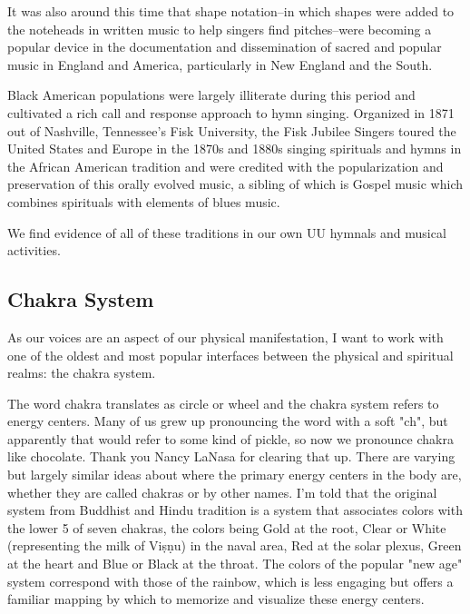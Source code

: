 \documentclass[12pt]{article}
\begin{document}
It was also around this time that shape notation–in which shapes were added to the noteheads in written music to help singers find pitches–were becoming a popular device in the documentation and dissemination of sacred and popular music in England and America, particularly in New England and the South.

Black American populations were largely illiterate during this period and cultivated a rich call and response approach to hymn singing. Organized in 1871 out of Nashville, Tennessee's Fisk University, the Fisk Jubilee Singers toured the United States and Europe in the 1870s and 1880s singing spirituals and hymns in the African American tradition and were credited with the popularization and preservation of this orally evolved music, a sibling of which is Gospel music which combines spirituals with elements of blues music.

We find evidence of all of these traditions in our own UU hymnals and musical activities.

\subsection*{Chakra System}

As our voices are an aspect of our physical manifestation, I want to work with one of the oldest and most popular interfaces between the physical and spiritual realms: the chakra system.

The word chakra translates as circle or wheel and the chakra system refers to energy centers. Many of us grew up pronouncing the word with a soft "ch", but apparently that would refer to some kind of pickle, so now we pronounce chakra like chocolate. Thank you Nancy LaNasa for clearing that up. There are varying but largely similar ideas about where the primary energy centers in the body are, whether they are called chakras or by other names. I'm told that the original system from Buddhist and Hindu tradition is a system that associates colors with the lower 5 of seven chakras, the colors being Gold at the root, Clear or White (representing the milk of Viṣṇu) in the naval area, Red at the solar plexus, Green at the heart and Blue or Black at the throat. The colors of the popular "new age" system correspond with those of the rainbow, which is less engaging but offers a familiar mapping by which to memorize and visualize these energy centers.
\end{document}
